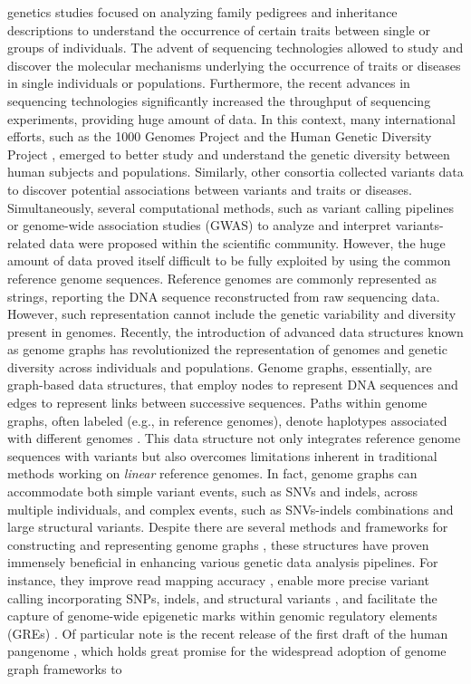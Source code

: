 \documentclass[a4paper, titlepage, openright]{book}
\begin{document}
genetics studies focused on analyzing family pedigrees and inheritance descriptions to understand the occurrence of certain traits between single or groups of individuals. The advent of sequencing technologies allowed to study and discover the molecular mechanisms underlying the occurrence of traits or diseases in single individuals or populations. Furthermore, the recent advances in sequencing technologies significantly increased the throughput of sequencing experiments, providing huge amount of data. In this context, many international efforts, such as the 1000 Genomes Project \citep{siva20081000, 10002015global} and the Human Genetic Diversity Project \citep{cavalli2005human, bergstrom2020insights}, emerged to better study and understand the genetic diversity between human subjects and populations. Similarly, other consortia \citep{sherry2001dbsnp, landrum2020clinvar} collected variants data to discover potential associations between variants and traits or diseases. Simultaneously, several computational methods, such as variant calling \citep{mckenna2010genome} pipelines or genome-wide association studies (GWAS) \citep{uffelmann2021genome} to analyze and interpret variants-related data were proposed within the scientific community. However, the huge amount of data proved itself difficult to be fully exploited by using the common reference genome sequences. Reference genomes are commonly represented as strings, reporting the DNA sequence reconstructed from raw sequencing data. However, such representation cannot include the genetic variability and diversity present in genomes. Recently, the introduction of advanced data structures known as genome graphs \citep{paten2017genome,garrison2018variation} has revolutionized the representation of genomes and genetic diversity across individuals and populations. Genome graphs, essentially, are graph-based data structures, that employ nodes to represent DNA sequences and edges to represent links between successive sequences. Paths within genome graphs, often labeled (e.g., in reference genomes), denote haplotypes associated with different genomes \citep{siren2020haplotype}. This data structure not only integrates reference genome sequences with variants but also overcomes limitations inherent in traditional methods working on \emph{linear} reference genomes. In fact, genome graphs can accommodate both simple variant events, such as SNVs and indels, across multiple individuals, and complex events, such as SNVs-indels combinations and large structural variants. Despite there are several methods and frameworks for constructing and representing genome graphs \citep{andreace2023comparing}, these structures have proven immensely beneficial in enhancing various genetic data analysis pipelines. For instance, they improve read mapping accuracy \citep{sibbesen2023haplotype}, enable more precise variant calling incorporating SNPs, indels, and structural variants \citep{garrison2018variation,ebler2022pangenome}, and facilitate the capture of genome-wide epigenetic marks within genomic regulatory elements (GREs) \citep{groza2020personalized,liao2023draft}. Of particular note is the recent release of the first draft of the human pangenome \citep{liao2023draft}, which holds great promise for the widespread adoption of genome graph frameworks to 
\end{document}
